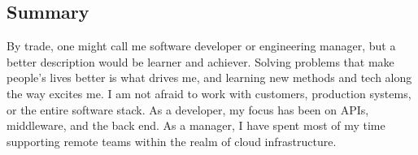 \documentclass[margin,line]{resume}
\begin{document}
\address{https://me.compile.fail $\bullet$ (618) 530-0659 $\bullet$ jesse@compile.fail}
\begin{resume}

\section{Summary}

{\small By trade, one might call me software developer or engineering manager, but a better description
would be learner and achiever. Solving problems that make people's lives better is what drives me, and learning
new methods and tech along the way excites me. I am not afraid to work with customers, production systems,
or the entire software stack. As a developer, my focus has been on APIs, middleware, and the back end. As a
manager, I have spent most of my time supporting remote teams within the realm of cloud infrastructure.}



\end{resume}
\end{document}
